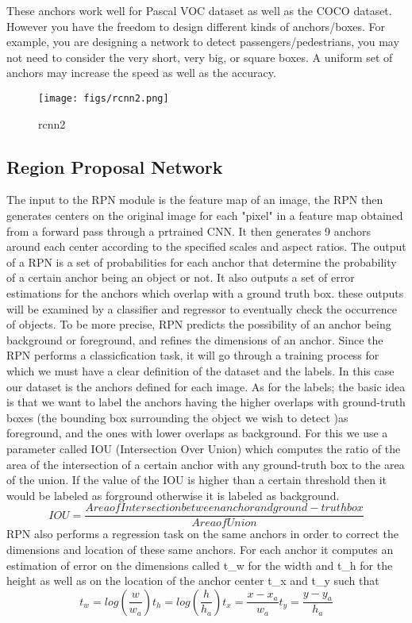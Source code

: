 These anchors work well for Pascal VOC dataset as well as the COCO dataset. However you have the freedom to design different kinds of anchors/boxes. For example, you are designing a network to detect passengers/pedestrians, you may not need to consider the very short, very big, or square boxes. A uniform set of anchors may increase the speed as well as the accuracy.

\begin{figure}[ht]
	\centering
	\texttt{[image: figs/rcnn2.png]}
	\caption{rcnn2}\label{fig:rcnn2}
\end{figure}


\subsection{Region Proposal Network}
The input to the RPN module is the feature map of an image, the RPN then generates centers on the original image for each "pixel" in a feature map obtained from a forward pass through a prtrained CNN. It then generates 9 anchors around each center according to the specified scales and aspect ratios.
The output of a RPN is a set of probabilities  for each anchor that determine the probability of a certain anchor being an object or not. It also outputs a set of error estimations for the anchors which overlap with a ground truth box. these outputs will be examined by a classifier and regressor to eventually check the occurrence of objects. To be more precise, RPN predicts the possibility of an anchor being background or foreground, and refines the dimensions of an anchor.
Since the RPN performs a classicfication task, it will go through a training process for which we must have a clear definition of the dataset and the labels. In this case our dataset is the anchors defined for each image. As for the labels; the basic idea  is that we want to label the anchors having the higher overlaps with ground-truth boxes (the bounding box surrounding the object we wish to detect )as foreground, and the ones with lower overlaps as background. For this we use a parameter called IOU (Intersection Over Union) which computes the ratio of the area of the intersection of a certain anchor with any ground-truth box to the area of the union. If the value of the IOU is higher than a certain threshold then it would be labeled as forground otherwise it is labeled as background.
$$
IOU = \frac{Area of Intersection between anchor and ground-truth box}{Area of Union}
$$
RPN also performs a regression task on the same anchors in order to correct the dimensions and location of these same anchors. For each anchor it computes an estimation of error on the dimensions called t_{w} for the width and t_{h} for the height as well as on the location of the anchor center t_{x} and t_{y} such that
$$
t_{w} = log(\frac{w}{w_{a}})
t_{h} = log(\frac{h}{h_{a}})
t_{x} = \frac{x - x_{a}}{w_{a}}
t_{y} = \frac{y - y_{a}}{h_{a}}
$$

